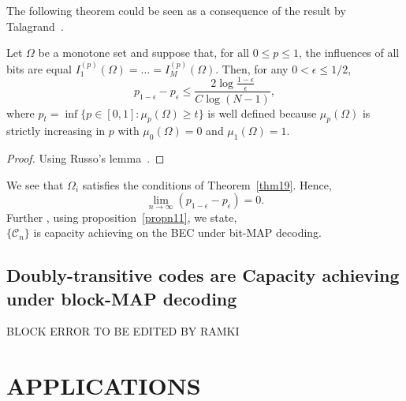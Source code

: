 \documentclass[
10pt, %
a4paper, %
oneside, %
headinclude,footinclude, %
BCOR5mm, %
]{scrartcl}
\begin{document}
The following theorem could be seen as a consequence of the result by Talagrand~\cite{talagrand}.
\begin{theorem}
Let $\Omega$ be a monotone set and suppose that, for all $0 \le p \le 1$, the influences of all bits are equal $I_1^{(p)}(\Omega) = \ldots = I_M^{(p)}(\Omega)$. Then, for any $0 < \epsilon \le 1/2$, $$p_{1-\epsilon} - p_\epsilon \le \frac{2 \log \frac{1-\epsilon}{\epsilon}}{C\log (N-1)},$$ where $p_t = \inf\{p \in [0,1] : \mu_p (\Omega) \ge t\}$ is well defined because $\mu_p(\Omega)$ is strictly increasing in $p$ with $\mu_0(\Omega) = 0$ and $\mu_1(\Omega)=1$.
\label{thm19}
\end{theorem}
\begin{proof}
Using Russo's lemma~\cite{russo}.
\end{proof}
We see that $\Omega_i$ satisfies the conditions of Theorem~\ref{thm19}.
Hence,\\$$\lim_{n \to \infty} (p_{1-\epsilon} - p_\epsilon) = 0.$$
Further , using proposition~\ref{propn11}, we state,\\$\{\mathcal{C}_n\}$ is capacity achieving on the BEC under bit-MAP decoding.

\subsection*{Doubly-transitive codes are Capacity achieving under block-MAP decoding}
BLOCK ERROR TO BE EDITED BY RAMKI

\section*{APPLICATIONS}
\end{document}
